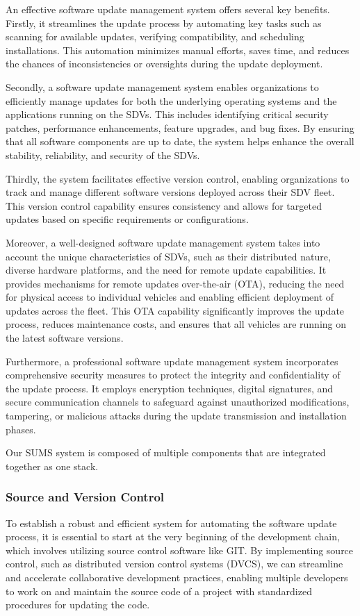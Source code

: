 \documentclass[
12pt,
oneside, 
onehalfspacing, 
nolistspacing, 
parskip, 
chapterinoneline, 
]{AASTCOMPUTER}
\begin{document}
An effective software update management system offers several key benefits. Firstly, it streamlines the update process by automating key tasks such as scanning for available updates, verifying compatibility, and scheduling installations. This automation minimizes manual efforts, saves time, and reduces the chances of inconsistencies or oversights during the update deployment.

Secondly, a software update management system enables organizations to efficiently manage updates for both the underlying operating systems and the applications running on the SDVs. This includes identifying critical security patches, performance enhancements, feature upgrades, and bug fixes. By ensuring that all software components are up to date, the system helps enhance the overall stability, reliability, and security of the SDVs.

Thirdly, the system facilitates effective version control, enabling organizations to track and manage different software versions deployed across their SDV fleet. This version control capability ensures consistency and allows for targeted updates based on specific requirements or configurations.

Moreover, a well-designed software update management system takes into account the unique characteristics of SDVs, such as their distributed nature, diverse hardware platforms, and the need for remote update capabilities. It provides mechanisms for remote updates over-the-air (OTA), reducing the need for physical access to individual vehicles and enabling efficient deployment of updates across the fleet. This OTA capability significantly improves the update process, reduces maintenance costs, and ensures that all vehicles are running on the latest software versions.

Furthermore, a professional software update management system incorporates comprehensive security measures to protect the integrity and confidentiality of the update process. It employs encryption techniques, digital signatures, and secure communication channels to safeguard against unauthorized modifications, tampering, or malicious attacks during the update transmission and installation phases.

Our SUMS system is composed of multiple components that are integrated together as one stack.
\subsubsection{Source and Version Control}
To establish a robust and efficient system for automating the software update process, it is essential to start at the very beginning of the development chain, which involves utilizing source control software like GIT. By implementing source control, such as distributed version control systems (DVCS), we can streamline and accelerate collaborative development practices, enabling multiple developers to work on and maintain the source code of a project with standardized procedures for updating the code.
\end{document}
